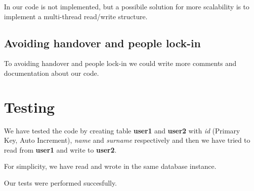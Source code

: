 In our code is not implemented, but a possibile solution for more scalability is to implement a multi-thread read/write structure.

\subsection{Avoiding handover and people lock-in}

To avoiding handover and people lock-in we could write more comments and documentation about our code.

\section{Testing}

We have tested the code by creating table \textbf{user1} and \textbf{user2} with \textit{id} (Primary Key, Auto Increment), \textit{name} and \textit{surname} respectively and then we have tried to read from \textbf{user1} and write to \textbf{user2}.

For simplicity, we have read and wrote in the same database instance.

Our tests were performed succesfully.